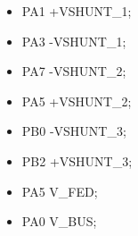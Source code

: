 \begin{itemize}
    \item PA1 \leftarrow +VSHUNT\_1;
    \item PA3 \leftarrow -VSHUNT\_1;
    \item PA7 \leftarrow -VSHUNT\_2;
    \item PA5 \leftarrow +VSHUNT\_2;  %
    \item PB0 \leftarrow -VSHUNT\_3;
    \item PB2 \leftarrow +VSHUNT\_3;  %
\end{itemize}


\begin{itemize}
    \item PA5 \rightarrow V\_FED;
    \item PA0 \rightarrow V\_BUS;
\end{itemize}
